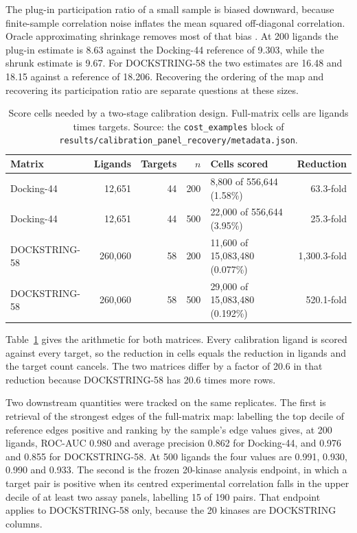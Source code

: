 The plug-in participation ratio of a small sample is biased downward, because finite-sample
correlation noise inflates the mean squared off-diagonal correlation. Oracle approximating
shrinkage removes most of that bias \cite{chen2010}. At 200 ligands the plug-in estimate is 8.63
against the Docking-44 reference of 9.303, while the shrunk estimate is 9.67. For DOCKSTRING-58
the two estimates are 16.48 and 18.15 against a reference of 18.206. Recovering the ordering of
the map and recovering its participation ratio are separate questions at these sizes.

\begin{table}[htbp]
\centering
\caption{Score cells needed by a two-stage calibration design. Full-matrix cells are ligands
times targets. Source: the \texttt{cost\_examples} block of
\texttt{results/calibration\_panel\_recovery/metadata.json}.}
\label{tab:s5cells}
\small
\begin{tabular}{lrrrlr}
\toprule
Matrix & Ligands & Targets & $n$ & Cells scored & Reduction \\
\midrule
Docking-44 & 12{,}651 & 44 & 200 & 8{,}800 of 556{,}644 (1.58\%) & 63.3-fold \\
Docking-44 & 12{,}651 & 44 & 500 & 22{,}000 of 556{,}644 (3.95\%) & 25.3-fold \\
DOCKSTRING-58 & 260{,}060 & 58 & 200 & 11{,}600 of 15{,}083{,}480 (0.077\%) & 1{,}300.3-fold \\
DOCKSTRING-58 & 260{,}060 & 58 & 500 & 29{,}000 of 15{,}083{,}480 (0.192\%) & 520.1-fold \\
\bottomrule
\end{tabular}
\end{table}

Table~\ref{tab:s5cells} gives the arithmetic for both matrices. Every calibration ligand is
scored against every target, so the reduction in cells equals the reduction in ligands and the
target count cancels. The two matrices differ by a factor of 20.6 in that reduction because
DOCKSTRING-58 has 20.6 times more rows.

Two downstream quantities were tracked on the same replicates. The first is retrieval of the
strongest edges of the full-matrix map: labelling the top decile of reference edges positive and
ranking by the sample's edge values gives, at 200 ligands, ROC-AUC 0.980 and average precision
0.862 for Docking-44, and 0.976 and 0.855 for DOCKSTRING-58. At 500 ligands the four values are
0.991, 0.930, 0.990 and 0.933. The second is the frozen 20-kinase analysis endpoint, in which
a target pair is positive when its centred experimental correlation falls in the upper decile of
at least two assay panels, labelling 15 of 190 pairs. That endpoint applies to DOCKSTRING-58
only, because the 20 kinases are DOCKSTRING columns.

